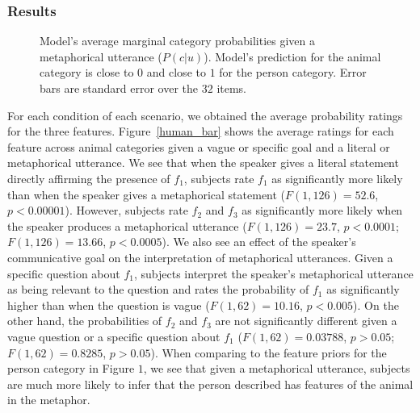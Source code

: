 \documentclass[10pt,letterpaper]{article}
\begin{document}
\subsubsection{Results}
\begin{figure}[ht]
\begin{center}
\end{center}
\caption{Model's average marginal category probabilities given a metaphorical utterance ($P(c | u)$). Model's prediction for the animal category is close to $0$ and close to $1$ for the person category. Error bars are standard error over the $32$ items.} 
\label{scatter_full}
\end{figure}
For each condition of each scenario, we obtained the average probability ratings for the three features. Figure~\ref{human_bar} shows the average ratings for each feature across animal categories given a vague or specific goal and a literal or metaphorical utterance. We see that when the speaker gives a literal statement directly affirming the presence of $f_1$, subjects rate $f_1$ as significantly more likely than when the speaker gives a metaphorical statement ($F(1, 126) = 52.6$, $p < 0.00001$). However, subjects rate $f_2$ and $f_3$ as significantly more likely when the speaker produces a metaphorical utterance ($F(1, 126) = 23.7$, $p < 0.0001$; $F(1, 126) =13.66$, $p < 0.0005$). We also see an effect of the speaker's communicative goal on the interpretation of metaphorical utterances. Given a specific question about $f_1$, subjects interpret the speaker's metaphorical utterance as being relevant to the question and rates the probability of $f_1$ as significantly higher than when the question is vague ($F(1, 62) = 10.16$, $p < 0.005$). On the other hand, the probabilities of $f_2$ and $f_3$ are not significantly different given a vague question or a specific question about $f_1$ ($F(1, 62) = 0.03788$, $p > 0.05$; $F(1, 62) = 0.8285$, $p > 0.05$). When comparing to the feature priors for the person category in Figure $1$, we see that given a metaphorical utterance, subjects are much more likely to infer that the person described has features of the animal in the metaphor.
\end{document}
